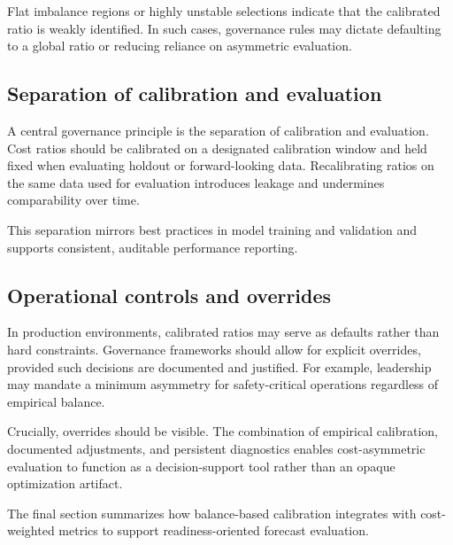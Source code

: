 Flat imbalance regions or highly unstable selections indicate that the calibrated
ratio is weakly identified.
In such cases, governance rules may dictate defaulting to a global ratio or
reducing reliance on asymmetric evaluation.

\subsection{Separation of calibration and evaluation}
\label{subsec:calibration_vs_evaluation}

A central governance principle is the separation of calibration and evaluation.
Cost ratios should be calibrated on a designated calibration window and held
fixed when evaluating holdout or forward-looking data.
Recalibrating ratios on the same data used for evaluation introduces leakage and
undermines comparability over time.

This separation mirrors best practices in model training and validation and
supports consistent, auditable performance reporting.

\subsection{Operational controls and overrides}
\label{subsec:controls}

In production environments, calibrated ratios may serve as defaults rather than
hard constraints.
Governance frameworks should allow for explicit overrides, provided such
decisions are documented and justified.
For example, leadership may mandate a minimum asymmetry for safety-critical
operations regardless of empirical balance.

Crucially, overrides should be visible.
The combination of empirical calibration, documented adjustments, and persistent
diagnostics enables cost-asymmetric evaluation to function as a decision-support
tool rather than an opaque optimization artifact.

The final section summarizes how balance-based calibration integrates with
cost-weighted metrics to support readiness-oriented forecast evaluation.
